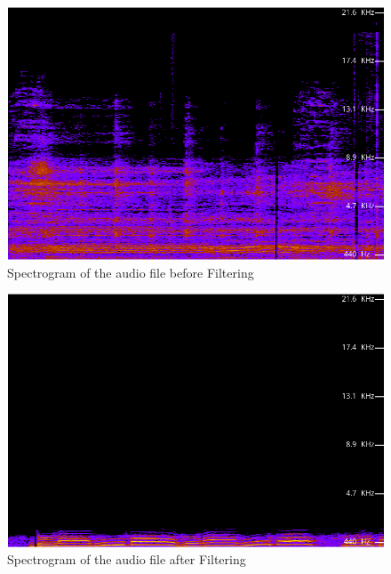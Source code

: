 \documentclass[journal,12pt,twocolumn]{IEEEtran}
\theoremstyle{remark}
\begin{document}
\begin{enumerate}[label=\thesection.\arabic*
,ref=\thesection.\theenumi]
\begin{figure}[H]
    \includegraphics[width=0.8\columnwidth]{figs/Before_audiofilter.png }
    \caption{Spectrogram of the audio file before Filtering}
    \label{fig:before_filter_plot}
\end{figure}
\begin{figure}[H]
\includegraphics[width=0.8\columnwidth]{figs/After_audiofilter.png}
    \caption{Spectrogram of the audio file after Filtering}
    \label{fig:after_filter_plot}
\end{figure}



\end{enumerate}
\end{document}

